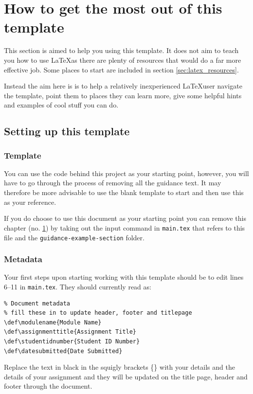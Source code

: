 \chapter{How to get the most out of this template} \label{cha:how-to-template}
This section is aimed to help you using this template. It does not aim to teach you how to use \LaTeX as there are plenty of resources that would do a far more effective job. Some places to start are included in section \ref{sec:latex_resources}.

Instead the aim here is is to help a relatively inexperienced \LaTeX user navigate the template, point them to places they can learn more, give some helpful hints and examples of cool stuff you can do.

\section{Setting up this template}

\subsection{Template}
You can use the code behind this project as your starting point, however, you will have to go through the process of removing all the guidance text. It may therefore be more advisable to use the blank template to start and then use this as your reference.

If you do choose to use this document as your starting point you can remove this chapter (no. \ref{cha:how-to-template}) by taking out the input command in \verb|main.tex| that refers to this file and the \verb|guidance-example-section| folder.

\subsection{Metadata}
Your first steps upon starting working with this template should be to edit lines \numrange{6}{11} in \verb|main.tex|. They should currently read as:

\begin{verbatim}
% Document metadata
% fill these in to update header, footer and titlepage
\def\modulename{Module Name}
\def\assignmenttitle{Assignment Title}
\def\studentidnumber{Student ID Number}
\def\datesubmitted{Date Submitted}
\end{verbatim}

Replace the text in black in the squigly brackets \{\} with your details and the details of your assignment and they will be updated on the title page, header and footer through the document.

